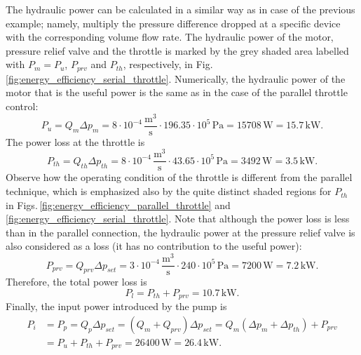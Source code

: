 The hydraulic power can be calculated in a similar way as in case of the previous example; namely, multiply the pressure difference dropped at a specific device with the corresponding volume flow rate. The hydraulic power of the motor, pressure relief valve and the throttle is marked by the grey shaded area labelled with $P_m=P_u$, $P_{prv}$ and $P_{th}$, respectively, in Fig.\,\ref{fig:energy_efficiency_serial_throttle}. Numerically, the hydraulic power of the motor that is the useful power is the same as in the case of the parallel throttle control:
%
\begin{equation}
P_u = Q_m \Delta p_m = 8 \cdot 10^{-4}\,\mathrm{\frac{m^3}{s}} \cdot 196.35 \cdot 10^5\,\mathrm{Pa} = 15708\,\mathrm{W} = 15.7\,\mathrm{kW}.
\end{equation}
%
The power loss at the throttle is
%
\begin{equation}
P_{th} = Q_{th} \Delta p_{th} = 8 \cdot 10^{-4}\,\mathrm{\frac{m^3}{s}} \cdot 43.65 \cdot 10^5\,\mathrm{Pa} = 3492\,\mathrm{W} = 3.5\,\mathrm{kW}.
\end{equation}
%
Observe how the operating condition of the throttle is different from the parallel technique, which is emphasized also by the quite distinct shaded regions for $P_{th}$ in Figs.\,\ref{fig:energy_efficiency_parallel_throttle} and \ref{fig:energy_efficiency_serial_throttle}. Note that although the power loss is less than in the parallel connection, the hydraulic power at the pressure relief valve is also considered as a loss (it has no contribution to the useful power):
%
\begin{equation}
P_{prv} = Q_{prv} \Delta p_{set} = 3 \cdot 10^{-4}\,\mathrm{\frac{m^3}{s}} \cdot 240 \cdot 10^5\,\mathrm{Pa} = 7200\,\mathrm{W} = 7.2\,\mathrm{kW}.
\end{equation}
%
Therefore, the total power loss is
%
\begin{equation}
P_{l}=P_{th}+P_{prv}=10.7\,\mathrm{kW}.
\end{equation}
%
Finally, the input power introduced by the pump is
%
\begin{equation}
\begin{split}
P_i &= P_p = Q_p \Delta p_{set} = (Q_m+Q_{prv}) \Delta p_{set} = Q_m (\Delta p_m+\Delta p_{th}) + P_{prv} \\
    &= P_u + P_{th} + P_{prv} = 26400\,\mathrm{W} = 26.4\,\mathrm{kW}.
\end{split}
\end{equation}
%
